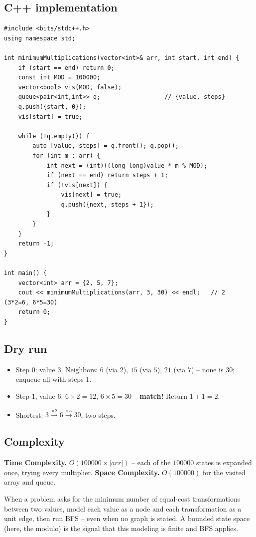 \subsection*{C++ implementation}

\begin{lstlisting}
#include <bits/stdc++.h>
using namespace std;

int minimumMultiplications(vector<int>& arr, int start, int end) {
    if (start == end) return 0;
    const int MOD = 100000;
    vector<bool> vis(MOD, false);
    queue<pair<int,int>> q;                  // {value, steps}
    q.push({start, 0});
    vis[start] = true;

    while (!q.empty()) {
        auto [value, steps] = q.front(); q.pop();
        for (int m : arr) {
            int next = (int)((long long)value * m % MOD);
            if (next == end) return steps + 1;
            if (!vis[next]) {
                vis[next] = true;
                q.push({next, steps + 1});
            }
        }
    }
    return -1;
}

int main() {
    vector<int> arr = {2, 5, 7};
    cout << minimumMultiplications(arr, 3, 30) << endl;   // 2  (3*2=6, 6*5=30)
    return 0;
}
\end{lstlisting}

\subsection*{Dry run}


\begin{itemize}
  \item Step $0$: value $3$. Neighbors: $6$ (via $2$), $15$ (via $5$),
        $21$ (via $7$) -- none is $30$; enqueue all with steps $1$.
  \item Step $1$, value $6$: $6\times2=12$, $6\times5=30$ --
        \textbf{match!} Return $1+1=2$.
  \item Shortest: $3\xrightarrow{\times2}6\xrightarrow{\times5}30$, two
        steps.
\end{itemize}

\subsection*{Complexity}

\begin{complexitybox}
\textbf{Time Complexity.} $O(100000 \times \lvert\textit{arr}\rvert)$ --
each of the $100000$ states is expanded once, trying every multiplier.
\textbf{Space Complexity.} $O(100000)$ for the visited array and queue.
\end{complexitybox}

\begin{takeawaybox}
When a problem asks for the minimum number of equal-cost transformations
between two values, model each value as a node and each transformation
as a unit edge, then run BFS -- even when no graph is stated. A bounded
state space (here, the modulo) is the signal that this modeling is
finite and BFS applies.
\end{takeawaybox}
